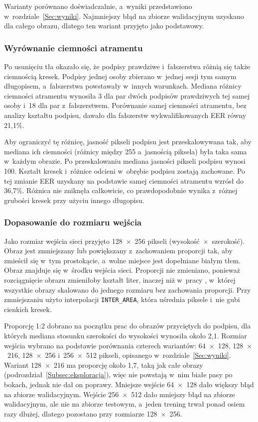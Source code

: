 \documentclass[12pt, twoside, openright]{article}
\begin{document}
Warianty porównano doświadczalnie, a~wyniki przedstawiono w~rozdziale~\ref{Sec:wyniki}.
Najmniejszy błąd na zbiorze walidacyjnym uzyskano dla całego obrazu, dlatego ten wariant przyjęto jako podstawowy.

\subsubsection*{Wyrównanie ciemności atramentu}

Po usunięciu tła okazało się, że podpisy prawdziwe i~fałszerstwa różnią się także ciemnością kresek.
Podpisy jednej osoby zbierano w~jednej sesji tym samym długopisem, a~fałszerstwa powstawały w~innych warunkach.
Mediana różnicy ciemności atramentu wynosiła 3 dla par dwóch podpisów prawdziwych tej samej osoby i~18 dla par z~fałszerstwem.
Porównanie samej ciemności atramentu, bez analizy kształtu podpisu, dawało dla fałszerstw wykwalifikowanych EER równy 21,1\%.

Aby ograniczyć tę różnicę, jasność pikseli podpisu jest przeskalowywana tak, aby mediana ich ciemności (różnicy między 255 a~jasnością piksela) była taka sama w~każdym obrazie.
Po przeskalowaniu mediana jasności pikseli podpisu wynosi 100.
Kształt kresek i~różnice odcieni w~obrębie podpisu zostają zachowane.
Po tej zmianie EER uzyskany na podstawie samej ciemności atramentu wzrósł do 36,7\%.
Różnica nie zniknęła całkowicie, co prawdopodobnie wynika z~różnej grubości kresek przy użyciu innego długopisu.

\subsubsection*{Dopasowanie do rozmiaru wejścia}

Jako rozmiar wejścia sieci przyjęto 128~$\times$~256 pikseli (wysokość~$\times$~szerokość).
Obraz jest zmniejszany lub powiększany z~zachowaniem proporcji tak, aby zmieścił się w~tym prostokącie, a~wolne miejsce jest dopełniane białym tłem.
Obraz znajduje się w~środku wejścia sieci.
Proporcji nie zmieniano, ponieważ rozciągnięcie obrazu zmieniłoby kształt liter, inaczej niż w~pracy \cite{dey2017}, w~której wszystkie obrazy skalowano do jednego rozmiaru bez zachowania proporcji.
Przy zmniejszaniu użyto interpolacji \texttt{INTER\_AREA}, która uśrednia piksele i~nie gubi cienkich kresek.

Proporcję 1:2 dobrano na początku prac do obrazów przyciętych do podpisu, dla których mediana stosunku szerokości do wysokości wynosiła około 2,1.
Rozmiar wejścia wybrano na podstawie porównania czterech wariantów: 64~$\times$~128, 128~$\times$~216, 128~$\times$~256 i~256~$\times$~512 pikseli, opisanego w~rozdziale~\ref{Sec:wyniki}.
Wariant 128~$\times$~216 ma proporcję około 1,7, taką jak całe obrazy (podrozdział~\ref{Subsec:eksploracja}), więc nie powstają w~nim białe pasy po bokach, jednak nie dał on poprawy.
Mniejsze wejście 64~$\times$~128 dało większy błąd na zbiorze walidacyjnym.
Wejście 256~$\times$~512 dało mniejszy błąd na zbiorze walidacyjnym, ale nie na zbiorze testowym, a~jeden trening trwał ponad osiem razy dłużej, dlatego pozostano przy rozmiarze 128~$\times$~256.
\end{document}
